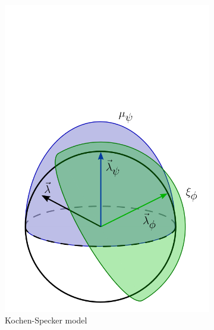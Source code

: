 \documentclass[%
 reprint,
superscriptaddress,
nofootinbib,
 amsmath,amssymb,
 prx, 
 accepted=2019-09-27,
]{quantumarticle}
\begin{document}
\begin{figure}[t]
  \centering
 \begin{subfigure}[t]{0.24\textwidth}
 \includegraphics[width=\textwidth]{KS_model_v2.png}
 \caption{Kochen-Specker model}
 \label{fig:KSmodel}
 \end{subfigure}
 \begin{subfigure}[t]{0.24\textwidth}

\end{subfigure}
\end{figure}
\end{document}
